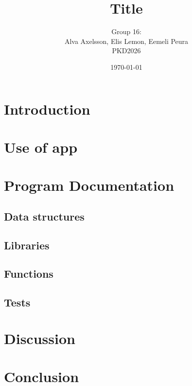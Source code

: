 \documentclass{article}
\title{Title}
\author{Group 16: \\
        Alva Axelsson, Elis Lemon, Eemeli Peura \\
        PKD2026}
\date{\today}
\begin{document}
\maketitle
\tableofcontents
\newpage

\section{Introduction}

\section{Use of app}

\section{Program Documentation}
\subsection{Data structures}
\subsection{Libraries}
\subsection{Functions}
\subsection{Tests}

\section{Discussion}

\section{Conclusion}
\end{document}
